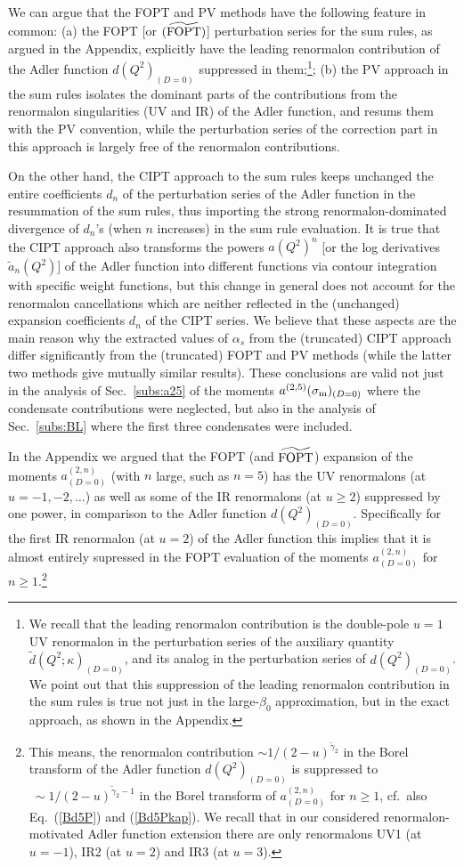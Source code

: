 \documentclass[aps,nofootinbib,showkeys,noshowpacs,preprintnumbers,amsmath,amssymb]{revtex4}
\newcommand{\sm}{{\sigma_{\rm m}}}
\newcommand{\ta}{{\widetilde a}}
\newcommand{\td}{{\widetilde d}}
\newcommand{\tg}{{\widetilde {\gamma}}}
\begin{document}
We can argue that the FOPT and PV methods have the following feature in common: (a) the FOPT [or $({\widetilde{\rm FOPT}})$] perturbation series for the sum rules, as argued in the Appendix, explicitly have the leading renormalon contribution  of the Adler function $d(Q^2)_{(D=0)}$ suppressed in them;\footnote{
  We recall that the leading renormalon contribution is the double-pole $u=1$ UV renormalon in the perturbation series of the auxiliary quantity ${\td}(Q^2;\kappa)_{(D=0)}$, and its analog in the perturbation series of $d(Q^2)_{(D=0)}$. We point out that this suppression of the leading renormalon contribution in the sum rules is true not just in the large-$\beta_0$ approximation, but in the exact approach, as shown in the Appendix.}; (b) the PV approach in the sum rules isolates the dominant parts of the contributions from the renormalon singularities (UV and IR) of the Adler function, and resums them with the PV convention, while the perturbation series of the correction part in this approach is largely free of the renormalon contributions.

On the other hand, the CIPT approach to the sum rules keeps unchanged the entire coefficients $d_n$ of the perturbation series of the Adler function in the resummation of the sum rules, thus importing the strong renormalon-dominated divergence of $d_n$'s (when $n$ increases) in the sum rule evaluation. It is true that the CIPT approach also transforms the powers $a(Q^2)^n$ [or the log derivatives $\ta_n(Q^2)$] of the Adler function into different functions via contour integration with specific weight functions, but this change in general does not account for the renormalon cancellations which are neither reflected in the (unchanged) expansion coefficients $d_n$ of the CIPT series. We believe that these aspects are the main reason why the extracted values of $\alpha_s$ from  the (truncated) CIPT approach  differ significantly from the (truncated) FOPT and PV methods (while the latter two methods give mutually similar results). These conclusions are valid not just in the analysis of Sec.~\ref{subs:a25} of the moments $a^{(2,5)}(\sm)_{(D=0)}$ where the condensate contributions were neglected, but also in the analysis of Sec.~\ref{subs:BL} where the first three condensates were included.

In the Appendix we argued that the FOPT (and ${\widetilde {\rm FOPT}}$) expansion of the moments $a^{(2,n)}_{(D=0)}$ (with $n$ large, such as $n=5$) has the UV renormalons (at $u=-1, -2, \ldots$) as well as some of the IR renormalons (at $u \geq 2$) suppressed by one power, in comparison to the Adler function $d(Q^2)_{(D=0)}$. Specifically for the first IR renormalon (at $u=2$) of the Adler function this implies that it is almost entirely supressed in the FOPT evaluation of the moments $a^{(2,n)}_{(D=0)}$ for $n \geq 1$.\footnote{This means, the renormalon contribution $\sim 1/(2 -u)^{\tg_2}$ in the Borel transform of the Adler function $d(Q^2)_{(D=0)}$ is suppressed to $~\sim 1/(2-u)^{\tg_2-1}$ in the Borel transform of $a^{(2,n)}_{(D=0)}$ for $n \geq 1$, cf.~also Eq.~(\ref{Bd5P}) and (\ref{Bd5Pkap}). We recall that in our considered renormalon-motivated Adler function extension there are only renormalons UV1 (at $u=-1$), IR2 (at $u=2$) and IR3 (at $u=3$).}
\end{document}
